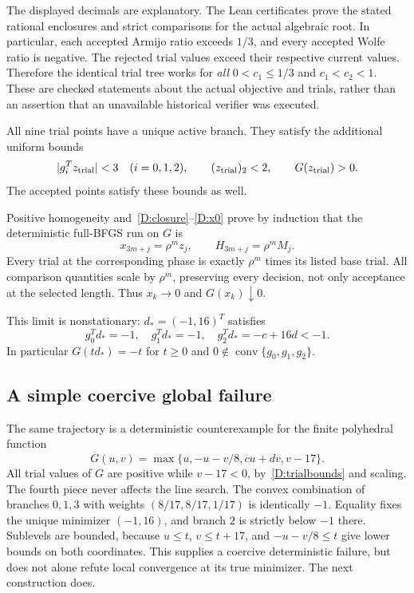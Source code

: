 The displayed decimals are explanatory. The Lean certificates prove the stated rational enclosures and strict comparisons for the actual algebraic root. In particular, each accepted Armijo ratio exceeds $1/3$, and every accepted Wolfe ratio is negative. The rejected trial values exceed their respective current values. Therefore the identical trial tree works for \emph{all} $0<c_1\le1/3$ and $c_1<c_2<1$. These are checked statements about the actual objective and trials, rather than an assertion that an unavailable historical verifier was executed.

All nine trial points have a unique active branch. They satisfy the additional uniform bounds
\begin{equation}\label{D:trialbounds}
 |g_i^Tz_{\rm trial}|<3\quad(i=0,1,2),
 \qquad (z_{\rm trial})_2<2,
 \qquad G(z_{\rm trial})>0.
\end{equation}
The accepted points satisfy these bounds as well.

Positive homogeneity and~\eqref{D:closure}--\eqref{D:x0} prove by induction that the deterministic full-BFGS run on $G$ is
\[
 x_{3m+j}=\rho^m z_j,\qquad H_{3m+j}=\rho^m M_j.
\]
Every trial at the corresponding phase is exactly $\rho^m$ times its listed base trial. All comparison quantities scale by $\rho^m$, preserving every decision, not only acceptance at the selected length. Thus $x_k\to0$ and $G(x_k)\downarrow0$.

This limit is nonstationary: $d_* =(-1,16)^T$ satisfies
\[
 g_0^Td_*=-1,\quad g_1^Td_*=-1,\quad g_2^Td_*=-c+16d<-1.
\]
In particular $G(td_*)=-t$ for $t\ge0$ and $0\notin\operatorname{conv}\{g_0,g_1,g_2\}$.

\subsection{A simple coercive global failure}
The same trajectory is a deterministic counterexample for the finite polyhedral function
\[
 \overline G(u,v)=\max\{u,-u-v/8,cu+dv,v-17\}.
\]
All trial values of $G$ are positive while $v-17<0$, by~\eqref{D:trialbounds} and scaling. The fourth piece never affects the line search. The convex combination of branches $0,1,3$ with weights $(8/17,8/17,1/17)$ is identically $-1$. Equality fixes the unique minimizer $(-1,16)$, and branch $2$ is strictly below $-1$ there. Sublevels are bounded, because $u\le t$, $v\le t+17$, and $-u-v/8\le t$ give lower bounds on both coordinates. This supplies a coercive deterministic failure, but does not alone refute local convergence at its true minimizer. The next construction does.


